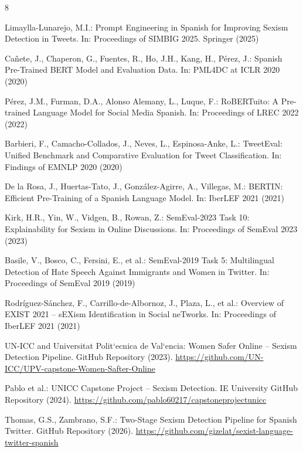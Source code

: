 \documentclass[runningheads]{llncs}
\begin{document}
\begin{thebibliography}{8}

Limaylla-Lunarejo, M.I.: Prompt Engineering in Spanish for Improving Sexism Detection
in Tweets. In: Proceedings of SIMBIG 2025. Springer (2025)

Ca\~nete, J., Chaperon, G., Fuentes, R., Ho, J.H., Kang, H., P\'erez, J.:
Spanish Pre-Trained BERT Model and Evaluation Data. In: PML4DC at ICLR 2020 (2020)

P\'erez, J.M., Furman, D.A., Alonso Alemany, L., Luque, F.: RoBERTuito:
A Pre-trained Language Model for Social Media Spanish. In: Proceedings of LREC 2022 (2022)

Barbieri, F., Camacho-Collados, J., Neves, L., Espinosa-Anke, L.:
TweetEval: Unified Benchmark and Comparative Evaluation for Tweet Classification.
In: Findings of EMNLP 2020 (2020)

De la Rosa, J., Huertas-Tato, J., Gonz\'alez-Agirre, A., Villegas, M.:
BERTIN: Efficient Pre-Training of a Spanish Language Model. In: IberLEF 2021 (2021)

Kirk, H.R., Yin, W., Vidgen, B., Rowan, Z.: SemEval-2023 Task 10: Explainability
for Sexism in Online Discussions. In: Proceedings of SemEval 2023 (2023)

Basile, V., Bosco, C., Fersini, E., et al.: SemEval-2019 Task 5: Multilingual Detection
of Hate Speech Against Immigrants and Women in Twitter. In: Proceedings of SemEval
2019 (2019)

Rodr\'iguez-S\'anchez, F., Carrillo-de-Albornoz, J., Plaza, L., et al.:
Overview of EXIST 2021 -- sEXism Identification in Social neTworks. In:
Proceedings of IberLEF 2021 (2021)

UN-ICC and Universitat Polit`ecnica de Val`encia: Women Safer Online -- Sexism Detection Pipeline. GitHub Repository (2023). \url{https://github.com/UN-ICC/UPV-capstone-Women-Safter-Online}

Pablo et al.: UNICC Capstone Project -- Sexism Detection. IE University GitHub Repository (2024). \url{https://github.com/pablo60217/capstoneprojectunicc}

Thomas, G.S., Zambrano, S.F.: Two-Stage Sexism Detection Pipeline for Spanish Twitter. GitHub Repository (2026). \url{https://github.com/gizelat/sexist-language-twitter-spanish}

\end{thebibliography}
\end{document}
